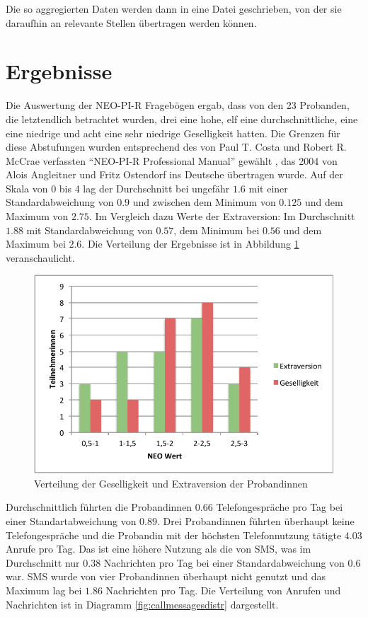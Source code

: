 Die so aggregierten Daten werden dann in eine Datei geschrieben, von der sie daraufhin an relevante Stellen übertragen werden können.

\section{Ergebnisse}

Die Auswertung der NEO-PI-R Fragebögen ergab, dass von den 23 Probanden, die letztendlich betrachtet wurden, drei eine hohe, elf eine durchschnittliche, eine eine niedrige und acht eine sehr niedrige Geselligkeit hatten.
Die Grenzen für diese Abstufungen wurden entsprechend des von Paul T. Costa und Robert R. McCrae verfassten "`NEO-PI-R Professional Manual"' gewählt \cite{costa1992neo}, das 2004 von Alois Angleitner und Fritz Ostendorf ins Deutsche übertragen wurde\cite{lin1973}.
Auf der Skala von 0 bis 4 lag der Durchschnitt bei ungefähr $1.6$ mit einer Standardabweichung von $0.9$ und zwischen dem Minimum von $0.125$ 
und dem Maximum von $2.75$.
Im Vergleich dazu Werte der Extraversion:
Im Durchschnitt $1.88$ mit Standardabweichung von $0.57$, dem Minimum bei $0.56$ und dem Maximum bei $2.6$.
Die Verteilung der Ergebnisse ist in Abbildung \ref{fig:neoergebnisse} veranschaulicht.

\begin{figure}[h]
    \centering
    \includegraphics{images/NeoErgebnisse.pdf}
    \caption{Verteilung der Geselligkeit und Extraversion der Probandinnen}
    \label{fig:neoergebnisse}
\end{figure}

Durchschnittlich führten die Probandinnen $0.66$ Telefongespräche pro Tag bei einer Standartabweichung von $0.89$.
Drei Probandinnen führten überhaupt keine Telefongespräche und die Probandin mit der höchsten Telefonnutzung tätigte $4.03$ Anrufe pro Tag.
Das ist eine höhere Nutzung als die von SMS, was im Durchschnitt nur $0.38$ Nachrichten pro Tag bei einer Standardabweichung von $0.6$ war.
SMS wurde von vier Probandinnen überhaupt nicht genutzt und das Maximum lag bei $1.86$ Nachrichten pro Tag.
Die Verteilung von Anrufen und Nachrichten ist in Diagramm \ref{fig:callmessagesdistr} dargestellt.

